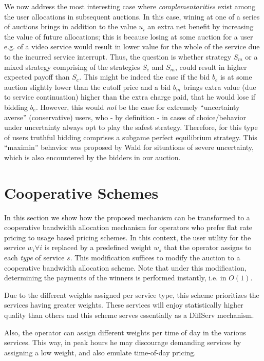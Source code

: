 \documentclass[a4paper]{article}
\begin{document}
We now address the most interesting case where {\em complementarities} exist 
among the user allocations in subsequent auctions. In this case, wining at
one of a series of auctions brings in addition to the value $u_i$
an extra net benefit by increasing the value of future allocations; this is 
because losing at some auction for a user e.g. of a video service would result
in lower value for the whole of the service due to the incurred service interrupt. 
Thus, the question is whether strategy $S_m$ 
or a mixed strategy comprising of the strategies $S_e$ and $S_m$,
could result in higher expected payoff than $S_e$. This 
might be indeed the case if the bid  $b_e$ is at some auction slightly lower 
than the cutoff price and a bid $b_m$ 
brings extra value (due to service continuation) higher than the extra 
charge paid, that he would lose if bidding $b_e$. 
However, this would {\em not} be the case for 
extremely ``uncertainty averse'' (conservative) 
users, who - by definition - in cases of choice/behavior under  {uncertainty} 
always opt to play the safest strategy. Therefore, for this type of users
truthful bidding comprises a subgame perfect equilibrium strategy.  
This ``maximin'' behavior was  proposed by Wald \cite{Wald} for situations of 
severe uncertainty, which is also encountered by the bidders in our auction. 



\section{Cooperative Schemes}\label{sec:coop}

In this section we show how the proposed mechanism can be transformed to
a cooperative bandwidth allocation mechanism for
operators who prefer flat rate pricing to usage based pricing schemes. 
In this context, the user utility for the service $w_i \forall i$ is replaced
by a predefined weight $w_s$ that the operator assigns to each {\em type} of
service $s$. This modification suffices to modify the auction to a 
cooperative bandwidth allocation scheme. Note that under this
modification, determining the payments of the winners 
is performed instantly, i.e. in $O(1)$.

Due to the different weights assigned per service type, 
this scheme prioritizes the services having greater weights. 
These services will enjoy statistically higher quality than others
and this scheme serves essentially as a DiffServ mechanism.

Also, the operator can assign different weights per time of day
in the various services. This way, in peak hours he may discourage  
demanding services by assigning 
a low weight, and also emulate time-of-day pricing. 
\end{document}
